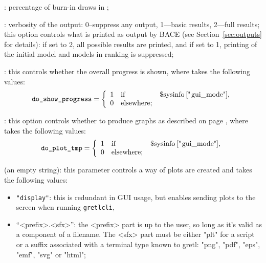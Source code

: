 : percentage
of burn-in draws in \MCcube;

: verbosity
of the output: 0--suppress any output, 1---basic results,
2---full results; this option controls what is printed as
output by BACE (see Section~\ref{sec:outputs} for details):
if set to 2, all possible results are printed, and if
set to 1, printing of the initial model and models in
ranking is suppressed;

:
this controls whether the overall progress is shown,
where  takes the following values:
\begin{equation}
	\texttt{\lstinline!do\_show\_progress!} = \left\{
	\begin{array}{cll}
		1 & \mathrm{if} & \textrm{\lstinline!$sysinfo["gui_mode"]!},\\
		0 & \mathrm{elsewhere}; &\\
	\end{array}
	\right.
	\label{eq:show_progress_setup}
\end{equation}

:
this option controls whether to produce graphs as
described on page \pageref{sec:bace_plots}, where
 takes the following values:
\begin{equation}
	\texttt{\lstinline!do\_plot\_tmp!} = \left\{
	\begin{array}{cll}
		1 & \mathrm{if} & \textrm{\lstinline!$sysinfo["gui_mode"]!},\\
		0 & \mathrm{elsewhere}; &\\
	\end{array}
	\right.
	\label{eq:do_plot_setup}
\end{equation}

 (an empty string):
this parameter controls a way of plots are created and takes
the following values:
\begin{itemize}
	\item \lstinline!"display"!: this is redundant in GUI usage,
		but enables sending plots to the screen when running
		\texttt{gretlcli},
	\item ``<prefix>.<sfx>'': the <prefix> part is up to the user,
		so long as it's valid as a component of a filename.
		The <sfx> part must be either "plt" for a 
		script or a suffix associated with a 
		terminal type known to gretl: "png", "pdf", "eps", "emf",
		"svg" or "html";
\end{itemize}


